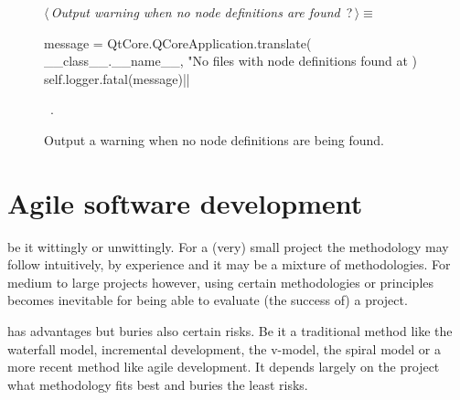 \documentclass[%
    a4paper,    %
    justified,  %
    nobib,      %
    openany     %
]{tufte-book}
\begin{document}
\begin{figure}[!h]
  \begin{flushleft} \small
\begin{minipage}{\linewidth}\label{scrap10}\raggedright\small
{} $\langle\,${\itshape Output warning when no node definitions are found}\nobreak\ {\footnotesize {?}}$\,\rangle\equiv$
\vspace{-1ex}
\begin{pythoncode}
    message = QtCore.QCoreApplication.translate(
        __class__.__name__,
        "No files with node definitions found at %
    )
    self.logger.fatal(message)|\NWsep|
\end{pythoncode}
\vspace{1.5ex}
\footnotesize
\begin{list}{}{\setlength{\itemsep}{-\parsep}\setlength{\itemindent}{-\leftmargin}}
\item \NWtxtMacroRefIn\ .

\item{}
\end{list}
\end{minipage}\vspace{4ex}
\end{flushleft}
\caption{Output a warning when no node definitions are being found.}
  \label{lst:nodes-controller-load-node-defs-warning-2}
\end{figure}

\section{Agile software development}
\label{sec:agile-software-development}

 be it wittingly
or unwittingly. For a (very) small project the methodology may follow intuitively,
by experience and it may be a mixture of methodologies. For medium to large
projects however, using certain methodologies or principles becomes inevitable
for being able to evaluate (the success of) a project.

 has advantages
but buries also certain risks. Be it a traditional method like the waterfall
model, incremental development, the v-model, the spiral model or a more recent
method like agile development. It depends largely on the project what
methodology fits best and buries the least risks.~\cite{haneen-risk-2012,
mens-se-2008}
\end{document}
